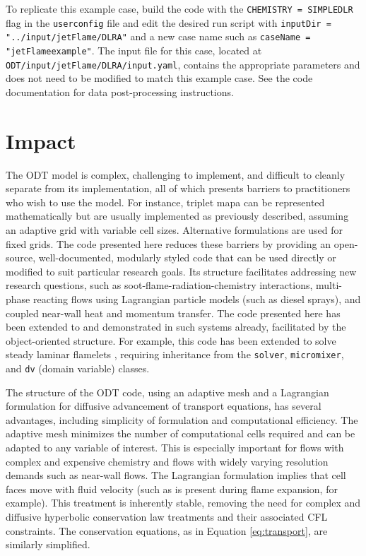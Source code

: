 \documentclass[preprint,12pt, a4paper]{elsarticle}
\begin{document}
To replicate this example case, build the code with the \texttt{CHEMISTRY = SIMPLEDLR} flag in the \texttt{user\textunderscore config} file and edit the desired run script with \texttt{inputDir = "../input/jetFlame/DLR\textunderscore A"} and a new case name such as \texttt{caseName = "jetFlame\textunderscore example"}. The input file for this case, located at \texttt{ODT/input/jetFlame/DLR\textunderscore A/input.yaml}, contains the appropriate parameters and does not need to be modified to match this example case. See the code documentation for data post-processing instructions.

\section{Impact}
\label{sec:impact}
The ODT model is complex, challenging to implement, and difficult to cleanly separate from its implementation, all of which presents barriers to practitioners who wish to use the model. For instance, triplet mapa can be represented mathematically but are usually implemented as previously described, assuming an adaptive grid with variable cell sizes. Alternative formulations are used for fixed grids. The code presented here reduces these barriers by providing an open-source, well-documented, modularly styled code that can be used directly or modified to suit particular research goals. Its structure facilitates addressing new research questions, such as soot-flame-radiation-chemistry interactions, multi-phase reacting flows using Lagrangian particle models (such as diesel sprays), and coupled near-wall heat and momentum transfer. The code presented here has been extended to and demonstrated in such systems already, facilitated by the object-oriented structure. For example, this code has been extended to solve steady laminar flamelets \cite{Peters_1984}, requiring inheritance from the \texttt{solver}, \texttt{micromixer}, and \texttt{dv} (domain variable) classes.

The structure of the ODT code, using an adaptive mesh and a Lagrangian formulation for diffusive advancement of transport equations, has several advantages, including simplicity of formulation and computational efficiency. The adaptive mesh minimizes the number of computational cells required and can be adapted to any variable of interest. This is especially important for flows with complex and expensive chemistry and flows with widely varying resolution demands such as near-wall flows. The Lagrangian formulation implies that cell faces move with fluid velocity (such as is present during flame expansion, for example). This treatment is inherently stable, removing the need for complex and diffusive hyperbolic conservation law treatments and their associated CFL constraints. The conservation equations, as in Equation \ref{eq:transport}, are similarly simplified.
\end{document}

